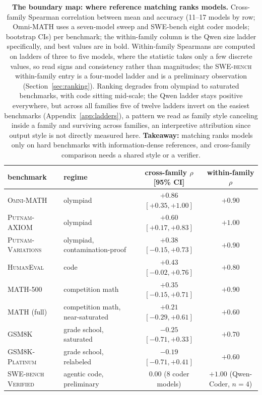 \begin{table}[t]
\centering
\footnotesize
\setlength{\tabcolsep}{2.5pt}
\begin{tabular}{llcc}
\toprule
benchmark & regime & cross-family $\rho$ [95\% CI] & within-family $\rho$ \\
\midrule
\textsc{Omni-MATH} & olympiad & $\mathbf{+0.86}$ $[+0.35, +1.00]$ & $+0.90$ \\
\textsc{Putnam-AXIOM} & olympiad & $+0.60$ $[+0.17, +0.83]$ & $\mathbf{+1.00}$ \\
\textsc{Putnam-Variations} & olympiad, contamination-proof & $+0.38$ $[-0.15, +0.73]$ & $+0.90$ \\
\textsc{HumanEval} & code & $+0.43$ $[-0.02, +0.76]$ & $+0.80$ \\
\textsc{MATH-500} & competition math & $+0.35$ $[-0.15, +0.71]$ & $+0.90$ \\
\textsc{MATH} (full) & competition math, near-saturated & $+0.21$ $[-0.29, +0.61]$ & $+0.60$ \\
\textsc{GSM8K} & grade school, saturated & $-0.25$ $[-0.71, +0.33]$ & $+0.70$ \\
\textsc{GSM8K-Platinum} & grade school, relabeled & $-0.19$ $[-0.71, +0.41]$ & $+0.60$ \\
\textsc{SWE-bench Verified} & agentic code, preliminary & $0.00$ (8 coder models) & $+1.00$ (Qwen-Coder, $n{=}4$) \\
\bottomrule
\end{tabular}
\caption{\textbf{The boundary map: where reference matching ranks models.}
Cross-family Spearman correlation between mean \tfa{} and accuracy (11--17 models by row; Omni-MATH uses a seven-model sweep and SWE-bench eight coder models; bootstrap CIs) per benchmark; the within-family column is the Qwen size ladder specifically, and best values are in bold.
Within-family Spearmans are computed on ladders of three to five models, where the statistic takes only a few discrete values, so read signs and consistency rather than magnitudes; the \textsc{SWE-bench} within-family entry is a four-model ladder and is a preliminary observation (Section~\ref{sec:ranking}).
Ranking degrades from olympiad to saturated benchmarks, with code sitting mid-scale; the Qwen ladder stays positive everywhere, but across all families five of twelve ladders invert on the easiest benchmarks (Appendix~\ref{app:ladders}), a pattern we read as family style canceling inside a family and surviving across families, an interpretive attribution since output style is not directly measured here.
\textbf{Takeaway:} matching ranks models only on hard benchmarks with information-dense references, and cross-family comparison needs a shared style or a verifier.}
\label{tab:map}
\end{table}

